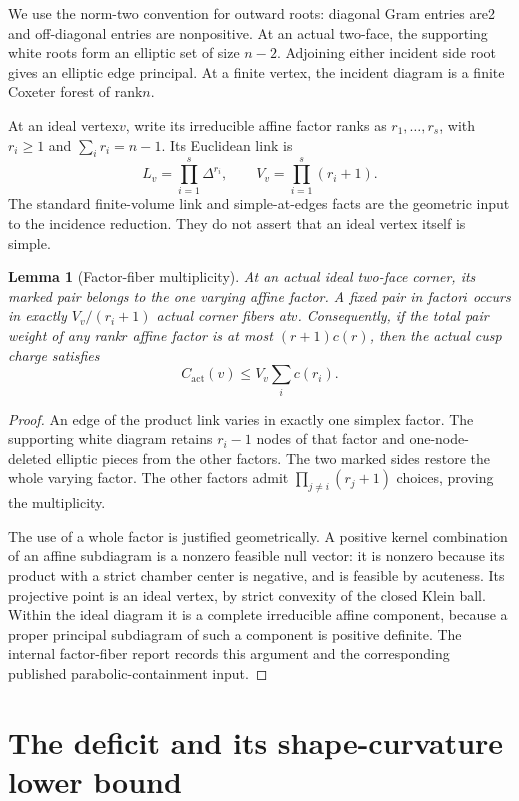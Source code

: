 \documentclass[11pt]{article}
\newtheorem{lemma}[theorem]{Lemma}
\theoremstyle{remark}\newtheorem{remark}[theorem]{Remark}
\newcommand{\actual}{\mathrm{act}}
\begin{document}
We use the norm-two convention for outward roots: diagonal Gram entries
are2 and off-diagonal entries are nonpositive. At an actual two-face, the
supporting white roots form an elliptic set of size $n-2$. Adjoining either
incident side root gives an elliptic edge principal. At a finite vertex,
the incident diagram is a finite Coxeter forest of rank$n$.

At an ideal vertex$v$, write its irreducible affine factor ranks as
$r_1,\ldots,r_s$, with $r_i\geq1$ and $\sum_i r_i=n-1$. Its Euclidean
link is
\[
 L_v=\prod_{i=1}^s\Delta^{r_i},\qquad
 V_v=\prod_{i=1}^s(r_i+1).
\]
The standard finite-volume link and simple-at-edges facts are the
geometric input to the incidence reduction. They do not assert that an
ideal vertex itself is simple.

\begin{lemma}[Factor-fiber multiplicity]\label{lem:fiber}
At an actual ideal two-face corner, its marked pair belongs to the one
varying affine factor. A fixed pair in factor$i$ occurs in exactly
$V_v/(r_i+1)$ actual corner fibers at$v$. Consequently, if the total pair
weight of any rank$r$ affine factor is at most $(r+1)c(r)$, then the
actual cusp charge satisfies
\[
 C_{\actual}(v)\leq V_v\sum_i c(r_i).
\]
\end{lemma}
\begin{proof}
An edge of the product link varies in exactly one simplex factor.
The supporting white diagram retains $r_i-1$ nodes of that factor and
one-node-deleted elliptic pieces from the other factors. The two marked
sides restore the whole varying factor. The other factors admit
$\prod_{j\ne i}(r_j+1)$ choices, proving the multiplicity.

The use of a whole factor is justified geometrically. A positive kernel
combination of an affine subdiagram is a nonzero feasible null vector:
it is nonzero because its product with a strict chamber center is
negative, and is feasible by acuteness. Its projective point is an ideal
vertex, by strict convexity of the closed Klein ball. Within the ideal
diagram it is a complete irreducible affine component, because a proper
principal subdiagram of such a component is positive definite. The
internal factor-fiber report records this argument and the corresponding
published parabolic-containment input.
\end{proof}

\section{The deficit and its shape-curvature lower bound}
\end{document}
